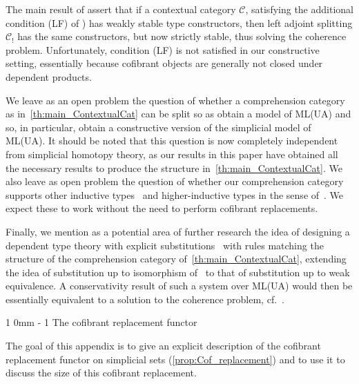 \documentclass[reqno,10pt,a4paper,oneside]{amsart}
\makeatletter
\renewcommand{\section}{\@startsection
{section}%
{1}%
{0mm}%
{-\baselineskip}%
{1\baselineskip}%
{\Large \bfseries}}%
\numberwithin{equation}{section}
\theoremstyle{mythm}
\theoremstyle{mydef}
\theoremstyle{myrmk}
\makeatother
\begin{document}
\begin{remark}
The main result of \cite{LumsdaineP:locuoc} assert that if a contextual category $\mathcal{C}$, satisfying 
the additional condition  (LF) of \cite[Definition 3.1.3]{LumsdaineP:locuoc}) has weakly stable type constructors, then left adjoint splitting $\mathcal{C}_!$ has the same constructors, but now strictly stable,
thus solving the coherence problem. Unfortunately, condition (LF) is not satisfied in our constructive
setting, essentially because cofibrant objects are generally not closed under dependent products.  
\end{remark}

We leave as an open problem the question of whether a comprehension category as in~\cref{th:main_ContextualCat} can be split so as obtain a model of ML(UA) and so, in particular,
obtain a constructive version of the simplicial model of ML(UA). It should be noted that this question
is now completely independent from simplicial homotopy theory, as our results in this paper have 
obtained all the necessary results to produce the structure in~\cref{th:main_ContextualCat}. 
We also leave as open problem the question of whether our comprehension category supports
other inductive types~\cite{vandenberg_moerdijk_2015} and higher-inductive types in the sense of~\cite{hottbook}. 
We expect these to work without the need to perform cofibrant replacements. 


Finally, we mention as a potential area of further research the idea of designing a dependent type
theory with explicit substitutions~\cite{AbadiM:exps} with rules matching the structure of the comprehension category of~\cref{th:main_ContextualCat}, extending the idea of 
substitution up to isomorphism of~\cite{CurienP:subi} to that of substitution up to weak equivalence. 
A conservativity result of such a system over ML(UA)
would then be essentially equivalent to a solution to the coherence problem, {cf.}~\cite{CurienPL:revcit}.


\appendix

\section{The cofibrant replacement functor}
\label{sec:appendix}


The goal of this appendix is to give an explicit description of the cofibrant replacement functor on simplicial sets (\cref{prop:Cof_replacement}) and to use it to discuss the size of this cofibrant replacement.
\end{document}

